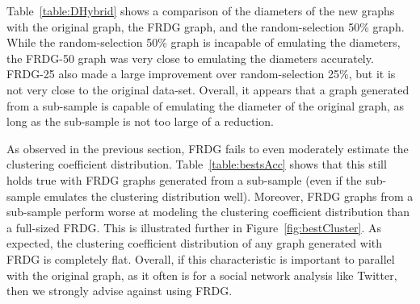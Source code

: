 \documentclass[pdftex,11pt,a4paper,twocolumn]{scrartcl}
\begin{document}
Table~\ref{table:DHybrid} shows a comparison of the diameters of the new graphs with the original graph, the FRDG graph, and the random-selection 50\% graph. While the random-selection 50\% graph is incapable of emulating the diameters, the FRDG-50 graph was very close to emulating the diameters accurately. FRDG-25 also made a large improvement over random-selection 25\%, but it is not very close to the original data-set. Overall, it appears that a graph generated from a sub-sample is capable of emulating the diameter of the original graph, as long as the sub-sample is not too large of a reduction. 

\begin{table}[h]
\centering
{}
\caption{Diameters of Generated-from-Sub-Sample Graphs}
\label{table:DHybrid}
\end{table}

As observed in the previous section, FRDG fails to even moderately estimate the clustering coefficient distribution. Table~\ref{table:bestsAcc} shows that this still holds true with FRDG graphs generated from a sub-sample (even if the sub-sample emulates the clustering distribution well). Moreover, FRDG graphs from a sub-sample perform worse at modeling the clustering coefficient distribution than a full-sized FRDG. This is illustrated further in Figure~\ref{fig:bestCluster}. As expected, the clustering coefficient distribution of any graph generated with FRDG is completely flat. Overall, if this characteristic is important to parallel with the original graph, as it often is for a social network analysis like Twitter, then we strongly advise against using FRDG. 

\begin{table}[h]
\centering
{}
\caption{A.C.C. of Generated-from-Sub-Sample Graphs}
\label{table:bestsAcc}
\end{table}
\end{document}
